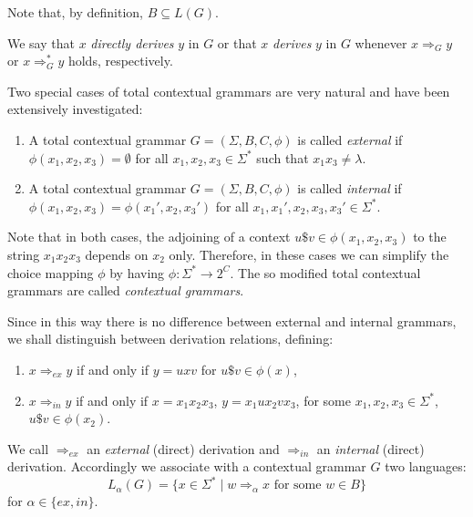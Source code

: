 Note that, by definition, $B \subseteq L(G)$.

We say that $x$ \emph{directly derives} $y$ in $G$ or that 
$x$ \emph{derives} $y$ in $G$ whenever $x \Rightarrow_G y$ or 
$x \Rightarrow^*_G y$ holds, respectively.

Two special cases of total contextual grammars are very natural and have been
extensively investigated:

\begin{enumerate}
\item A total contextual grammar $G = (\Sigma, B, C, \phi)$ is called 
\emph{external}
if $\phi(x_1, x_2, x_3) = \emptyset$ for all $x_1, x_2, x_3 \in \Sigma^*$
such that $x_1 x_3 \neq \lambda$.
\item A total contextual grammar $G = (\Sigma, B, C, \phi)$ is called 
\emph{internal}
if $\phi(x_1, x_2, x_3) = \phi(x_1', x_2, x_3')$ for all
$x_1, x_1', x_2, x_3, x_3' \in \Sigma^*$.
\end{enumerate}

Note that in both cases, the adjoining of a context $u \$ v \in \phi(x_1, x_2, x_3)$
to the string $x_1 x_2 x_3$ depends on $x_2$ only. Therefore, in these cases we can
simplify the choice mapping $\phi$ by having 
$\phi: \Sigma^* \to 2^C$. The so modified total contextual grammars are called 
\emph{contextual grammars}.

Since in this way there is no difference between external and internal grammars,
we shall distinguish between derivation relations, defining:

\begin{enumerate}
\item $x \Rightarrow_{ex} y$ if and only if $y = u x v$ for $u \$ v \in \phi(x)$,
\item $x \Rightarrow_{in} y$ if and only if $x = x_1 x_2 x_3$, $y = x_1 u x_2 v x_3$,
for some $x_1, x_2, x_3 \in \Sigma^*$, $u \$ v \in \phi(x_2)$.
\end{enumerate}

We call $\Rightarrow_{ex}$ an \emph{external} (direct) 
derivation and $\Rightarrow_{in}$ an \emph{internal} 
(direct) derivation. Accordingly we associate with a contextual grammar $G$ two
languages:
$$L_{\alpha}(G) = \{x \in \Sigma^* \mid w \Rightarrow_{\alpha} x 
\text{ for some } w \in B\}$$
for $\alpha \in \{ex, in\}$.

